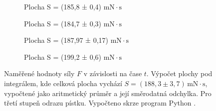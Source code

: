 \begin{figure}[H]
    \vspace{0.5em}
\begin{subfigure}[t]{0.3\textwidth}
            \centering
            
            \caption{
                Plocha S = (185,8 ± 0,4) $\mathrm{mN \cdot s}$
            }
            \label{fig:integrales-3g}
        \end{subfigure}%
    \hfill
\begin{subfigure}[t]{0.3\textwidth}
            \centering
            
            \caption{
                Plocha S = (184,7 ± 0,3) $\mathrm{mN \cdot s}$
            }
            \label{fig:integrales-3h}
        \end{subfigure}%
    \hfill
\begin{subfigure}[t]{0.3\textwidth}
            \centering
            
            \caption{
                Plocha S = (187,97 ± 0,17) $\mathrm{mN \cdot s}$
            }
            \label{fig:integrales-3i}
        \end{subfigure}

    \vspace{0.5em}
\begin{subfigure}[t]{0.3\textwidth}
            \centering
            
            \caption{
                Plocha S = (199,2 ± 0,6) $\mathrm{mN \cdot s}$
            }
            \label{fig:integrales-3j}
        \end{subfigure}

        \caption{
            Naměřené hodnoty síly $F$ v závislosti na čase $t$. Výpočet plochy pod integrálem, kde celková plocha vychází $S=(188,3 \pm 3,7)\,\mathrm{mN\cdot s}$, vypočtené jako aritmetický průměr a její směrodatná odchylka. Pro třetí stupeň odrazu pístku. Vypočteno skrze program Python \cite{GitHubMAT}.
        }
        \label{fig:integrales-3}
    \end{figure}
    